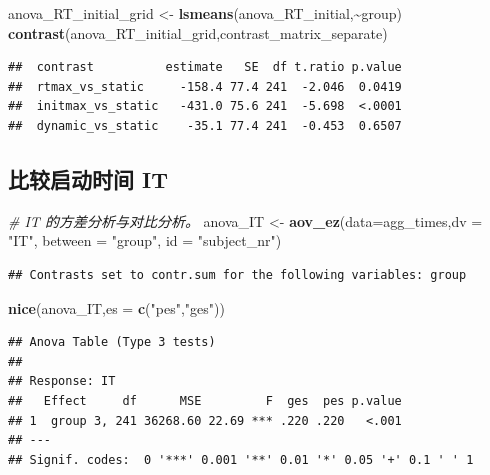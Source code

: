 \documentclass[
]{article}
\newenvironment{Shaded}{\begin{snugshade}}{\end{snugshade}}
\newcommand{\AttributeTok}[1]{\textcolor[rgb]{0.13,0.29,0.53}{#1}}
\newcommand{\CommentTok}[1]{\textcolor[rgb]{0.56,0.35,0.01}{\textit{#1}}}
\newcommand{\FunctionTok}[1]{\textcolor[rgb]{0.13,0.29,0.53}{\textbf{#1}}}
\newcommand{\NormalTok}[1]{#1}
\newcommand{\OtherTok}[1]{\textcolor[rgb]{0.56,0.35,0.01}{#1}}
\newcommand{\SpecialCharTok}[1]{\textcolor[rgb]{0.81,0.36,0.00}{\textbf{#1}}}
\newcommand{\StringTok}[1]{\textcolor[rgb]{0.31,0.60,0.02}{#1}}
\begin{document}
\begin{Shaded}
\begin{Highlighting}[]
\NormalTok{anova\_RT\_initial\_grid }\OtherTok{\textless{}{-}} \FunctionTok{lsmeans}\NormalTok{(anova\_RT\_initial,}\SpecialCharTok{\textasciitilde{}}\NormalTok{group)}
\FunctionTok{contrast}\NormalTok{(anova\_RT\_initial\_grid,contrast\_matrix\_separate)}
\end{Highlighting}
\end{Shaded}

\begin{verbatim}
##  contrast          estimate   SE  df t.ratio p.value
##  rtmax_vs_static     -158.4 77.4 241  -2.046  0.0419
##  initmax_vs_static   -431.0 75.6 241  -5.698  <.0001
##  dynamic_vs_static    -35.1 77.4 241  -0.453  0.6507
\end{verbatim}

\subsection{比较启动时间
IT}\label{ux6bd4ux8f83ux542fux52a8ux65f6ux95f4-it}

\begin{Shaded}
\begin{Highlighting}[]
\CommentTok{\# IT 的方差分析与对比分析。}
\NormalTok{anova\_IT }\OtherTok{\textless{}{-}} \FunctionTok{aov\_ez}\NormalTok{(}\AttributeTok{data=}\NormalTok{agg\_times,}\AttributeTok{dv =} \StringTok{"IT"}\NormalTok{, }\AttributeTok{between =} \StringTok{"group"}\NormalTok{, }\AttributeTok{id =} \StringTok{"subject\_nr"}\NormalTok{)}
\end{Highlighting}
\end{Shaded}

\begin{verbatim}
## Contrasts set to contr.sum for the following variables: group
\end{verbatim}

\begin{Shaded}
\begin{Highlighting}[]
\FunctionTok{nice}\NormalTok{(anova\_IT,}\AttributeTok{es =} \FunctionTok{c}\NormalTok{(}\StringTok{"pes"}\NormalTok{,}\StringTok{"ges"}\NormalTok{))}
\end{Highlighting}
\end{Shaded}

\begin{verbatim}
## Anova Table (Type 3 tests)
## 
## Response: IT
##   Effect     df      MSE         F  ges  pes p.value
## 1  group 3, 241 36268.60 22.69 *** .220 .220   <.001
## ---
## Signif. codes:  0 '***' 0.001 '**' 0.01 '*' 0.05 '+' 0.1 ' ' 1
\end{verbatim}
\end{document}
